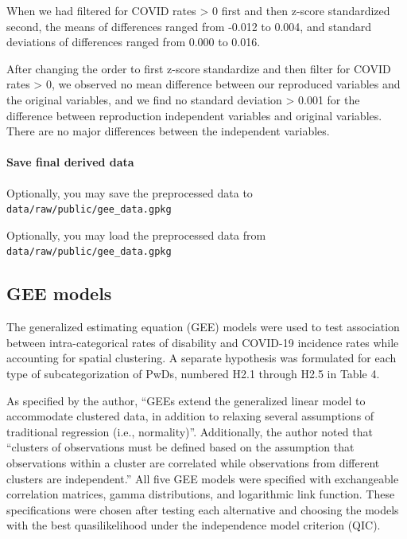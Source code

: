 \documentclass[
]{article}
\begin{document}
When we had filtered for COVID rates \textgreater{} 0 first and then
z-score standardized second, the means of differences ranged from -0.012
to 0.004, and standard deviations of differences ranged from 0.000 to
0.016.

After changing the order to first z-score standardize and then filter
for COVID rates \textgreater{} 0, we observed no mean difference between
our reproduced variables and the original variables, and we find no
standard deviation \textgreater{} 0.001 for the difference between
reproduction independent variables and original variables. There are no
major differences between the independent variables.

\hypertarget{save-final-derived-data}{%
\paragraph{Save final derived data}\label{save-final-derived-data}}

Optionally, you may save the preprocessed data to
\texttt{data/raw/public/gee\_data.gpkg}

Optionally, you may load the preprocessed data from
\texttt{data/raw/public/gee\_data.gpkg}

\hypertarget{gee-models}{%
\subsection{GEE models}\label{gee-models}}

The generalized estimating equation (GEE) models were used to test
association between intra-categorical rates of disability and COVID-19
incidence rates while accounting for spatial clustering. A separate
hypothesis was formulated for each type of subcategorization of PwDs,
numbered H2.1 through H2.5 in Table 4.

As specified by the author, ``GEEs extend the generalized linear model
to accommodate clustered data, in addition to relaxing several
assumptions of traditional regression (i.e., normality)''. Additionally,
the author noted that ``clusters of observations must be defined based
on the assumption that observations within a cluster are correlated
while observations from different clusters are independent.'' All five
GEE models were specified with exchangeable correlation matrices, gamma
distributions, and logarithmic link function. These specifications were
chosen after testing each alternative and choosing the models with the
best quasilikelihood under the independence model criterion (QIC).
\end{document}
